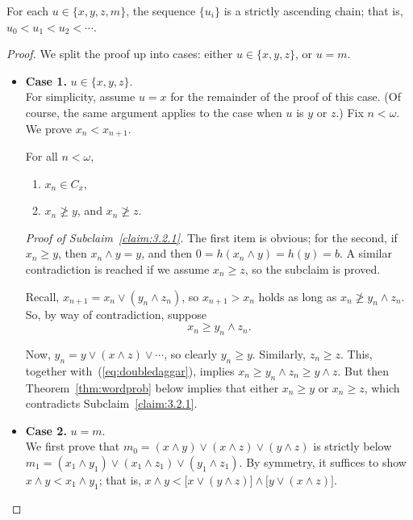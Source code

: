 \begin{lemma}%
  \label{lem:1}
For each $u \in \{x, y, z, m\}$, the sequence $\{u_i\}$ is a strictly ascending chain; that is, $u_0 < u_1 < u_2 < \cdots$.  
\end{lemma}
\begin{proof}  We split the proof up into cases: either $u \in \{x, y, z\}$, or $u = m$.
\begin{itemize}
  \item  \textbf{Case 1.} $u \in \{x, y, z\}$.\\
  For simplicity, assume $u = x$ for the remainder of the proof of this case.  
  (Of course, the same argument applies to the case when $u$ is $y$ or $z$.) 
  Fix $n <\omega$.  We prove $x_n < x_{n+1}$.

  \begin{subclaim}\label{claim:3.2.1}For all $n< \omega$,
    \begin{enumerate}
      \item 
      $x_n\in C_x$, 
      \item $x_n\ngeq y$, and $x_n\ngeq z$.
    \end{enumerate}
  \end{subclaim}
  {\it Proof of Subclaim~\ref{claim:3.2.1}.}    The first item is obvious; 
  for the second, if $x_n\geqslant y$, then $x_n\wedge y = y$, and 
    then $0 = h(x_n\wedge y) = h(y) = b$.  A similar contradiction is reached 
    if we assume $x_n\geqslant z$, so the subclaim is proved.
  
    Recall, $x_{n+1} = x_n \vee (y_n \wedge z_n)$, so $x_{n+1} > x_n$
    holds as long as $x_n \ngeqslant y_n \wedge z_n$.
    So, by way of contradiction, suppose 
    \begin{equation}\label{eq:doubledaggar}
      x_n \geqslant y_n \wedge z_n.
    \end{equation}

    Now, $y_n = y \vee (x \wedge z) \vee \cdots$, so clearly $y_n \geqslant y$.  
    Similarly, $z_n \geqslant z$.  This, together with~(\ref{eq:doubledaggar}), 
    implies $x_n \geqslant y_n \wedge z_n \geqslant y \wedge z$.  
    But then Theorem~\ref{thm:wordprob} below implies that either 
    $x_n \geqslant y$ or $x_n \geqslant z$, which contradicts Subclaim~\ref{claim:3.2.1}.

\item \textbf{Case 2.} $u = m$.\\
  We first prove that $m_0 = (x\wedge y) \vee (x\wedge z)\vee (y\wedge z)$ is strictly below 
  $m_1 = (x_1\wedge y_1) \vee (x_1\wedge z_1) \vee (y_1\wedge z_1)$.
  By symmetry, it suffices to show $x\wedge y < x_1\wedge y_1$;
  that is, $x\wedge y < \bigl[x \vee (y\wedge z)\bigr]\wedge \bigl[y \vee (x\wedge z)\bigr]$.


\end{itemize}
\end{proof}
